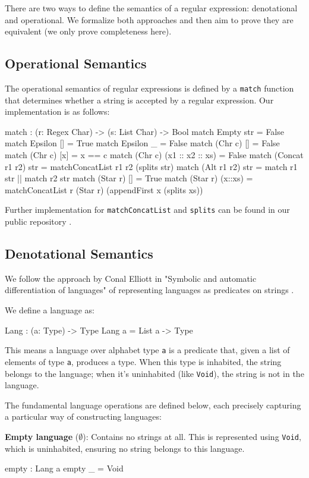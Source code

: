 \documentclass[]{rptuseminar}
\begin{document}
There are two ways to define the semantics of a regular expression: denotational and operational. We formalize both approaches and then aim to prove they are equivalent (we only prove completeness here).

\subsection{Operational Semantics}
The operational semantics of regular expressions is defined by a \texttt{match} function that determines whether a string is accepted by a regular expression. Our implementation is as follows:

\label{sec:operational-semantics}  
\begin{idris}
match : (r: Regex Char) -> (s: List Char) -> Bool
match Empty str = False
match Epsilon [] = True
match Epsilon _ = False
match (Chr c) [] = False
match (Chr c) [x] = x == c
match (Chr c) (x1 :: x2 :: xs) = False
match (Concat r1 r2) str =   
    matchConcatList r1 r2 (splits str)
match (Alt r1 r2) str =   
    match r1 str || match r2 str  
match (Star r) [] = True
match (Star r) (x::xs) =
    matchConcatList r (Star r) (appendFirst x (splits xs))
\end{idris}

Further implementation for \texttt{matchConcatList} and \texttt{splits} can be found in our public repository \cite{idris-seminar}.

\subsection{Denotational Semantics}
We follow the approach by Conal Elliott in "Symbolic and automatic differentiation of languages" of representing languages as predicates on strings \cite{conal2021elliott}.

We define a language as:
\begin{idris}
Lang : (a: Type) -> Type
Lang a = List a -> Type
\end{idris}

This means a language over alphabet type \texttt{a} is a predicate that, given a list of elements of type \texttt{a}, produces a type. When this type is inhabited, the string belongs to the language; when it's uninhabited (like \texttt{Void}), the string is not in the language.

The fundamental language operations are defined below, each precisely capturing a particular way of constructing languages:

\textbf{Empty language} ($\emptyset$): Contains no strings at all. This is represented using \texttt{Void}, which is uninhabited, ensuring no string belongs to this language.
\begin{idris}
empty : Lang a
empty _ = Void
\end{idris}
\end{document}
